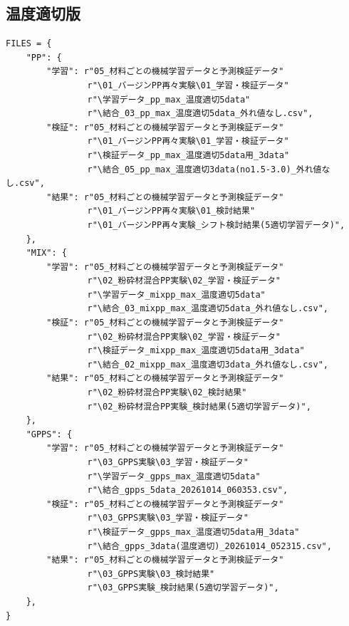 \documentclass[paper=a4paper,fontsize=10.5pt,line_length=44zw,number_of_lines=40]{jlreq}
\begin{document}
\subsection*{温度適切版}
\begin{Verbatim}[fontsize=\footnotesize,frame=single]
FILES = {
    "PP": {
        "学習": r"05_材料ごとの機械学習データと予測検証データ"
                r"\01_バージンPP再々実験\01_学習・検証データ"
                r"\学習データ_pp_max_温度適切5data"
                r"\結合_03_pp_max_温度適切5data_外れ値なし.csv",
        "検証": r"05_材料ごとの機械学習データと予測検証データ"
                r"\01_バージンPP再々実験\01_学習・検証データ"
                r"\検証データ_pp_max_温度適切5data用_3data"
                r"\結合_05_pp_max_温度適切3data(no1.5-3.0)_外れ値なし.csv",
        "結果": r"05_材料ごとの機械学習データと予測検証データ"
                r"\01_バージンPP再々実験\01_検討結果"
                r"\01_バージンPP再々実験_シフト検討結果(5適切学習データ)",
    },
    "MIX": {
        "学習": r"05_材料ごとの機械学習データと予測検証データ"
                r"\02_粉砕材混合PP実験\02_学習・検証データ"
                r"\学習データ_mixpp_max_温度適切5data"
                r"\結合_03_mixpp_max_温度適切5data_外れ値なし.csv",
        "検証": r"05_材料ごとの機械学習データと予測検証データ"
                r"\02_粉砕材混合PP実験\02_学習・検証データ"
                r"\検証データ_mixpp_max_温度適切5data用_3data"
                r"\結合_02_mixpp_max_温度適切3data_外れ値なし.csv",
        "結果": r"05_材料ごとの機械学習データと予測検証データ"
                r"\02_粉砕材混合PP実験\02_検討結果"
                r"\02_粉砕材混合PP実験_検討結果(5適切学習データ)",
    },
    "GPPS": {
        "学習": r"05_材料ごとの機械学習データと予測検証データ"
                r"\03_GPPS実験\03_学習・検証データ"
                r"\学習データ_gpps_max_温度適切5data"
                r"\結合_gpps_5data_20261014_060353.csv",
        "検証": r"05_材料ごとの機械学習データと予測検証データ"
                r"\03_GPPS実験\03_学習・検証データ"
                r"\検証データ_gpps_max_温度適切5data用_3data"
                r"\結合_gpps_3data(温度適切)_20261014_052315.csv",
        "結果": r"05_材料ごとの機械学習データと予測検証データ"
                r"\03_GPPS実験\03_検討結果"
                r"\03_GPPS実験_検討結果(5適切学習データ)",
    },
}
\end{Verbatim}
\end{document}
